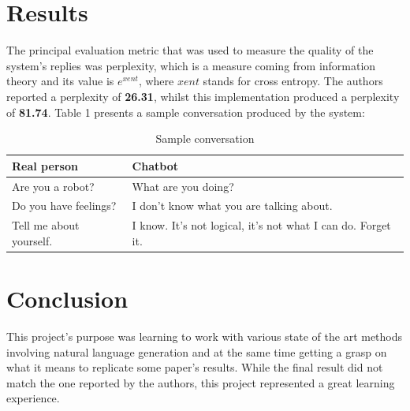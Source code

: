 \documentclass{article}
\begin{document}
\section{Results}

The principal evaluation metric that was used to measure the quality of the system's replies was perplexity, which is a measure coming from information theory and its value is \(e^{xent}\), where \(xent\) stands for cross entropy. The authors reported a perplexity of \textbf{26.31}, whilst this implementation produced a perplexity of \textbf{81.74}. Table 1 presents a sample conversation produced by the system:

\begin{center}
  \begin{table}[h]
  \caption{Sample conversation}
  \begin{tabular}{ | m{6.5cm} | m{6.5cm} |}
    \hline
    Real person & Chatbot \\ \hline
    Are you a robot? & What are you doing? \\
    Do you have feelings? & I don't know what you are talking about. \\
    Tell me about yourself. & I know. It's not logical, it's not what I can do. Forget it. \\
    \hline
  \end{tabular}
  \end{table}
\end{center}

\section{Conclusion}
This project's purpose was learning to work with various state of the art methods involving natural language generation and at the same time getting a grasp on what it means to replicate some paper's results. While the final result did not match the one reported by the authors, this project represented a great learning experience.



\end{document}
